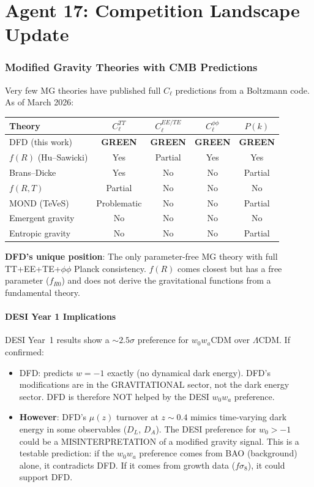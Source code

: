 \documentclass[11pt,a4paper]{article}
\newcommand{\GREEN}{\textcolor{dfdgreen}{\textbf{GREEN}}}
\begin{document}
\part{Agent 17: Competition Landscape Update}
\label{part:competition}

\section{Modified Gravity Theories with CMB Predictions}

Very few MG theories have published full $C_\ell$ predictions from a Boltzmann code. As of March 2026:

\begin{center}
\begin{longtable}{p{3.5cm}cccc}
\toprule
\textbf{Theory} & $C_\ell^{TT}$ & $C_\ell^{EE/TE}$ & $C_\ell^{\phi\phi}$ & $P(k)$ \\
\midrule
DFD (this work) & \GREEN & \GREEN & \GREEN & \GREEN \\
$f(R)$ (Hu--Sawicki) & Yes & Partial & Yes & Yes \\
Brans--Dicke & Yes & No & No & Partial \\
$f(R,T)$ & Partial & No & No & No \\
MOND (TeVeS) & Problematic & No & No & Partial \\
Emergent gravity & No & No & No & No \\
Entropic gravity & No & No & No & Partial \\
\bottomrule
\end{longtable}
\end{center}

\textbf{DFD's unique position}: The only parameter-free MG theory with full TT+EE+TE+$\phi\phi$ Planck consistency. $f(R)$ comes closest but has a free parameter ($f_{R0}$) and does not derive the gravitational functions from a fundamental theory.

\subsection{DESI Year 1 Implications}

DESI Year~1 results show a $\sim 2.5\sigma$ preference for $w_0 w_a$CDM over $\Lambda$CDM. If confirmed:
\begin{itemize}
\item DFD: predicts $w = -1$ exactly (no dynamical dark energy). DFD's modifications are in the GRAVITATIONAL sector, not the dark energy sector. DFD is therefore NOT helped by the DESI $w_0 w_a$ preference.
\item \textbf{However}: DFD's $\mu(z)$ turnover at $z \sim 0.4$ mimics time-varying dark energy in some observables ($D_L$, $D_A$). The DESI preference for $w_0 > -1$ could be a MISINTERPRETATION of a modified gravity signal. This is a testable prediction: if the $w_0 w_a$ preference comes from BAO (background) alone, it contradicts DFD. If it comes from growth data ($f\sigma_8$), it could support DFD.
\end{itemize}
\end{document}

